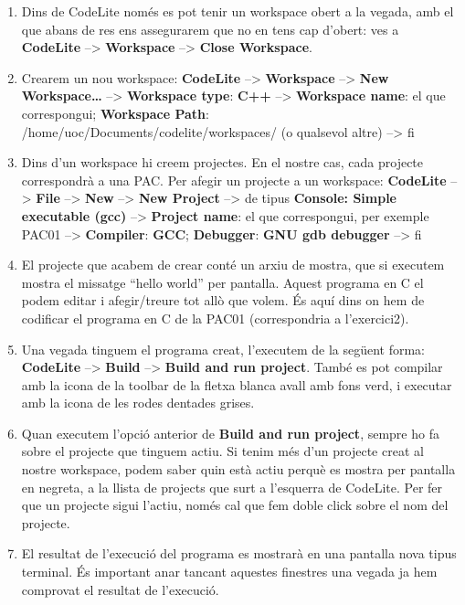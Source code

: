 \documentclass[]{book}
\providecommand{\tightlist}{%
  \setlength{\itemsep}{0pt}\setlength{\parskip}{0pt}}
\begin{document}
\begin{enumerate}
\def\labelenumi{\arabic{enumi}.}
\tightlist
\item
  Dins de CodeLite només es pot tenir un workspace obert a la vegada,
  amb el que abans de res ens assegurarem que no en tens cap d'obert:
  ves a \textbf{CodeLite} --\textgreater{} \textbf{Workspace}
  --\textgreater{} \textbf{Close Workspace}.
\item
  Crearem un nou workspace: \textbf{CodeLite} --\textgreater{}
  \textbf{Workspace} --\textgreater{} \textbf{New Workspace\ldots{}}
  --\textgreater{} \textbf{Workspace type}: \textbf{C++}
  --\textgreater{} \textbf{Workspace name}: el que correspongui;
  \textbf{Workspace Path}: /home/uoc/Documents/codelite/workspaces/ (o
  qualsevol altre) --\textgreater{} fi
\item
  Dins d'un workspace hi creem projectes. En el nostre cas, cada
  projecte correspondrà a una PAC. Per afegir un projecte a un
  workspace: \textbf{CodeLite} --\textgreater{} \textbf{File}
  --\textgreater{} \textbf{New} --\textgreater{} \textbf{New Project}
  --\textgreater{} de tipus \textbf{Console: Simple executable (gcc)}
  --\textgreater{} \textbf{Project name}: el que correspongui, per
  exemple PAC01 --\textgreater{} \textbf{Compiler}: \textbf{GCC};
  \textbf{Debugger}: \textbf{GNU gdb debugger} --\textgreater{} fi
\item
  El projecte que acabem de crear conté un arxiu de mostra, que si
  executem mostra el missatge ``hello world'' per pantalla. Aquest
  programa en C el podem editar i afegir/treure tot allò que volem. És
  aquí dins on hem de codificar el programa en C de la PAC01
  (correspondria a l'exercici2).
\item
  Una vegada tinguem el programa creat, l'executem de la següent forma:
  \textbf{CodeLite} --\textgreater{} \textbf{Build} --\textgreater{}
  \textbf{Build and run project}. També es pot compilar amb la icona de
  la toolbar de la fletxa blanca avall amb fons verd, i executar amb la
  icona de les rodes dentades grises.
\item
  Quan executem l'opció anterior de \textbf{Build and run project},
  sempre ho fa sobre el projecte que tinguem actiu. Si tenim més d'un
  projecte creat al nostre workspace, podem saber quin està actiu perquè
  es mostra per pantalla en negreta, a la llista de projects que surt a
  l'esquerra de CodeLite. Per fer que un projecte sigui l'actiu, només
  cal que fem doble click sobre el nom del projecte.
\item
  El resultat de l'execució del programa es mostrarà en una pantalla
  nova tipus terminal. És important anar tancant aquestes finestres una
  vegada ja hem comprovat el resultat de l'execució.
\end{enumerate}
\end{document}
